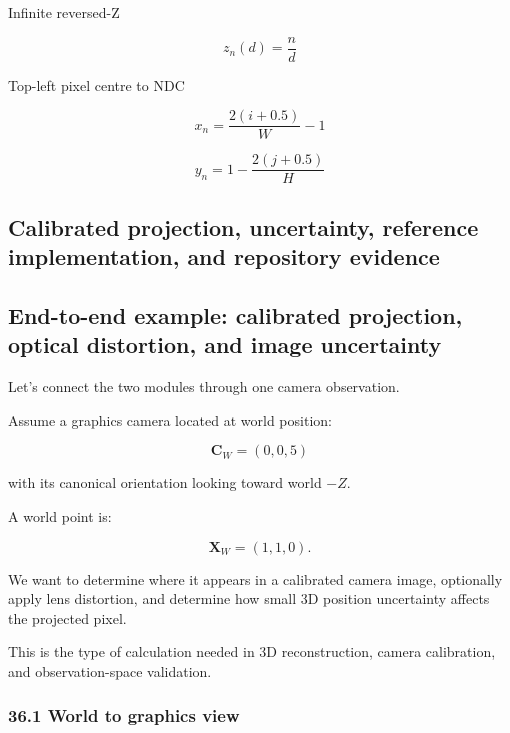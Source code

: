 Infinite reversed-Z

\[
 \boxed{ z_n(d)=\frac nd }
\]

Top-left pixel centre to NDC

\[
 \boxed{ x_n=\frac{2(i+0.5)}W-1 }
\]

\[
 \boxed{ y_n=1-\frac{2(j+0.5)}H }
\]

\subsection{Calibrated projection, uncertainty, reference implementation, and repository evidence}\label{02-foundations-ii-ch037-calibrated-projection-uncertainty-reference-implementation-and-repository-evidence}

\hypertarget{02-foundations-ii-ch037-calibrated-projection-uncertainty-reference-implementation-and-repository-evidence}{}

\subsection{End-to-end example: calibrated projection, optical distortion, and image uncertainty}\label{02-foundations-ii-ch037-end-to-end-example-calibrated-projection-optical-distortion-and-image-uncertainty}

\hypertarget{02-foundations-ii-ch037-end-to-end-example-calibrated-projection-optical-distortion-and-image-uncertainty}{}

Let's connect the two modules through one camera observation.

Assume a graphics camera located at world position:

\[
 \mathbf C_W=(0,0,5)
\]

with its canonical orientation looking toward world \(-Z\).

A world point is:

\[
 \mathbf X_W=(1,1,0).
\]

We want to determine where it appears in a calibrated camera image, optionally apply lens distortion, and determine how small 3D position uncertainty affects the projected pixel.

This is the type of calculation needed in 3D reconstruction, camera calibration, and observation-space validation.

\subsubsection{36.1 World to graphics view}\label{02-foundations-ii-ch037-world-to-graphics-view}


